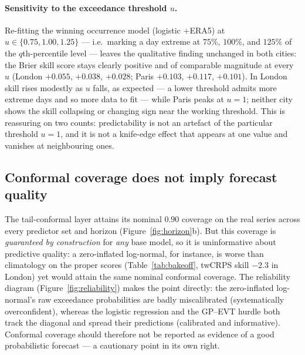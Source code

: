 \documentclass[11pt,a4paper]{article}
\begin{document}
\paragraph{Sensitivity to the exceedance threshold $u$.} Re-fitting the winning
occurrence model (logistic $+$ERA5) at $u\in\{0.75,1.00,1.25\}$ --- i.e.\ marking
a day extreme at $75\%$, $100\%$, and $125\%$ of the $q$th-percentile level ---
leaves the qualitative finding unchanged in both cities: the Brier skill score
stays clearly positive and of comparable magnitude at every $u$ (London
$+0.055$, $+0.038$, $+0.028$; Paris $+0.103$, $+0.117$, $+0.101$). In London
skill rises modestly as $u$ falls, as expected --- a lower threshold admits more
extreme days and so more data to fit --- while Paris peaks at $u=1$; neither city
shows the skill collapsing or changing sign near the working threshold. This is
reassuring on two counts: predictability is not an artefact of the particular
threshold $u=1$, and it is not a knife-edge effect that appears at one value and
vanishes at neighbouring ones.

\subsection{Conformal coverage does not imply forecast quality}\label{sec:res-cal}
The tail-conformal layer attains its nominal $0.90$ coverage on the real series
across every predictor set and horizon (Figure~\ref{fig:horizon}b). But this
coverage is \emph{guaranteed by construction} for \emph{any} base model, so it is
uninformative about predictive quality: a zero-inflated log-normal, for instance,
is worse than climatology on the proper scores (Table~\ref{tab:bakeoff}, twCRPS
skill $-2.3$ in London) yet would attain the same nominal conformal coverage. The
reliability diagram
(Figure~\ref{fig:reliability}) makes the point directly: the zero-inflated
log-normal's raw exceedance probabilities are badly miscalibrated (systematically
overconfident), whereas the logistic regression and the GP--EVT hurdle both track
the diagonal and spread their predictions (calibrated and informative). Conformal
coverage should therefore not be reported as evidence of a good probabilistic
forecast --- a cautionary point in its own right.
\end{document}
